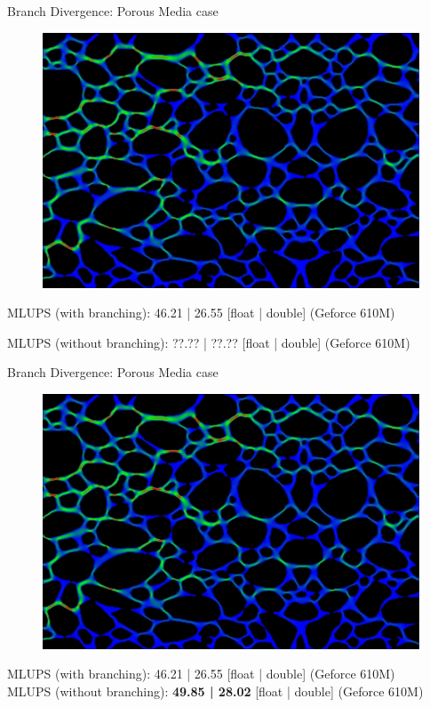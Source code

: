 \documentclass[9pt]{beamer}
\newcommand{\emphasize}[1]{\textbf{\color{red} #1 } }
\begin{document}
\begin{frame}[t]{Branch Divergence: Porous Media case}
\begin{figure}
	\includegraphics[scale=0.18]{images/porous-media-case.jpg}
	\centering
\end{figure}
MLUPS (with branching): 46.21 | 26.55 [float | double] (Geforce 610M)

MLUPS (without branching): ??.?? | ??.?? [float | double] (Geforce 610M)

\end{frame}

\begin{frame}[t]{Branch Divergence: Porous Media case}
\begin{figure}
	\includegraphics[scale=0.18]{images/porous-media-case.jpg}
	\centering
\end{figure}
MLUPS (with branching): 46.21 | 26.55 [float | double] (Geforce 610M)\\

MLUPS (without branching): \emphasize{49.85 | 28.02} [float | double] (Geforce 610M)
\end{frame}
\end{document}

